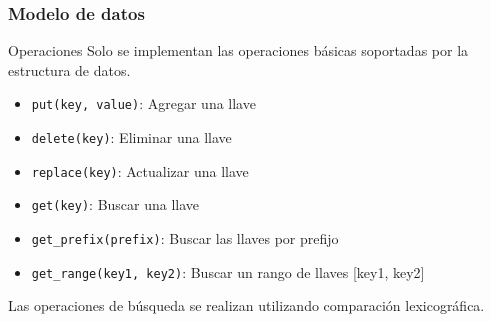 \begin{frame}
    \frametitle{Modelo de datos}

    \begin{block}{Operaciones}
        Solo se implementan las operaciones básicas soportadas por la estructura de datos.
        \begin{itemize}
            \item \texttt{put(key, value)}: Agregar una llave
            \item \texttt{delete(key)}: Eliminar una llave
            \item \texttt{replace(key)}: Actualizar una llave
            \item \texttt{get(key)}: Buscar una llave 
            \item \texttt{get\_prefix(prefix)}: Buscar las llaves por prefijo  
            \item \texttt{get\_range(key1, key2)}: Buscar un rango de llaves [key1, key2]
        \end{itemize}

        Las operaciones de búsqueda se realizan utilizando comparación lexicográfica.

        

    \end{block}

\end{frame}

